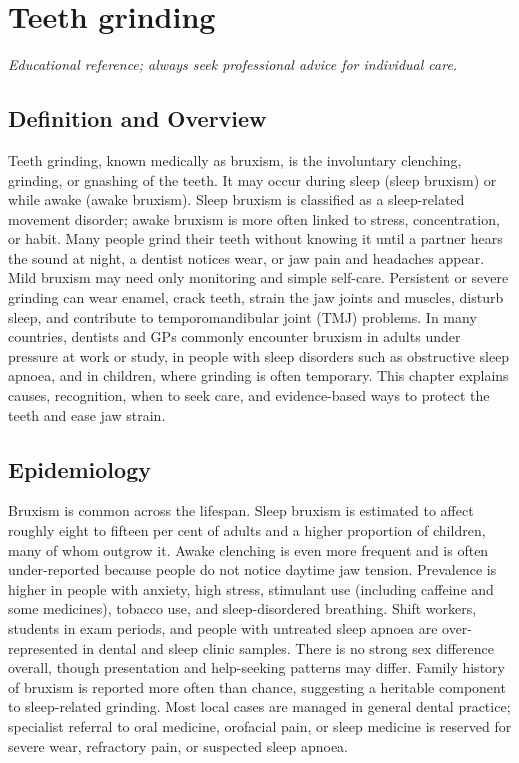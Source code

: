 \chapter{Teeth grinding}

\medskip
\noindent\textit{Educational reference; always seek professional advice for individual care.}

\section*{Definition and Overview}
Teeth grinding, known medically as bruxism, is the involuntary clenching, grinding, or gnashing of the teeth. It may occur during sleep (sleep bruxism) or while awake (awake bruxism). Sleep bruxism is classified as a sleep-related movement disorder; awake bruxism is more often linked to stress, concentration, or habit. Many people grind their teeth without knowing it until a partner hears the sound at night, a dentist notices wear, or jaw pain and headaches appear. Mild bruxism may need only monitoring and simple self-care. Persistent or severe grinding can wear enamel, crack teeth, strain the jaw joints and muscles, disturb sleep, and contribute to temporomandibular joint (TMJ) problems. In many countries, dentists and GPs commonly encounter bruxism in adults under pressure at work or study, in people with sleep disorders such as obstructive sleep apnoea, and in children, where grinding is often temporary. This chapter explains causes, recognition, when to seek care, and evidence-based ways to protect the teeth and ease jaw strain.

\section*{Epidemiology}
Bruxism is common across the lifespan. Sleep bruxism is estimated to affect roughly eight to fifteen per cent of adults and a higher proportion of children, many of whom outgrow it. Awake clenching is even more frequent and is often under-reported because people do not notice daytime jaw tension. Prevalence is higher in people with anxiety, high stress, stimulant use (including caffeine and some medicines), tobacco use, and sleep-disordered breathing. Shift workers, students in exam periods, and people with untreated sleep apnoea are over-represented in dental and sleep clinic samples. There is no strong sex difference overall, though presentation and help-seeking patterns may differ. Family history of bruxism is reported more often than chance, suggesting a heritable component to sleep-related grinding. Most local cases are managed in general dental practice; specialist referral to oral medicine, orofacial pain, or sleep medicine is reserved for severe wear, refractory pain, or suspected sleep apnoea.

